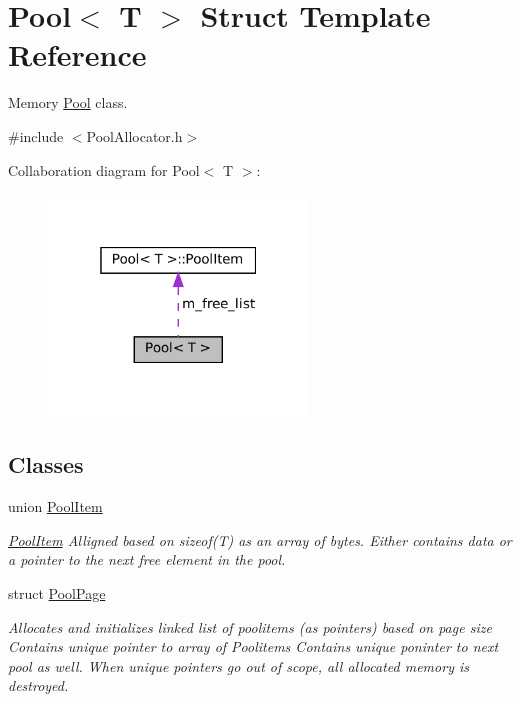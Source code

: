 \hypertarget{structPool}{}\section{Pool$<$ T $>$ Struct Template Reference}
\label{structPool}


Memory \hyperlink{structPool}{Pool} class.  




{\ttfamily \#include $<$Pool\+Allocator.\+h$>$}



Collaboration diagram for Pool$<$ T $>$\+:\nopagebreak
\begin{figure}[H]
\begin{center}
\leavevmode
\includegraphics[width=196pt]{structPool__coll__graph}
\end{center}
\end{figure}
\subsection*{Classes}
\begin{DoxyCompactItemize}
\item 
union \hyperlink{unionPool_1_1PoolItem}{Pool\+Item}
\begin{DoxyCompactList}\small\item\em \hyperlink{unionPool_1_1PoolItem}{Pool\+Item} Alligned based on sizeof(\+T) as an array of bytes. Either contains data or a pointer to the next free element in the pool. \end{DoxyCompactList}\item 
struct \hyperlink{structPool_1_1PoolPage}{Pool\+Page}
\begin{DoxyCompactList}\small\item\em Allocates and initializes linked list of poolitems (as pointers) based on page size Contains unique pointer to array of Poolitems Contains unique poninter to next pool as well. When unique pointers go out of scope, all allocated memory is destroyed. \end{DoxyCompactList}\end{DoxyCompactItemize}
